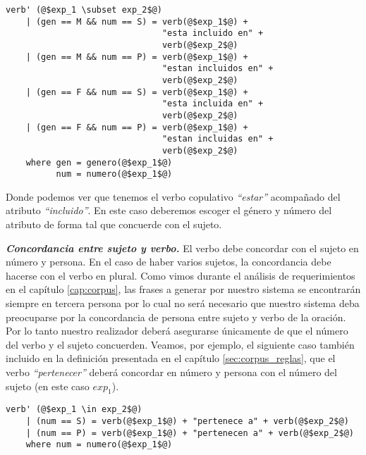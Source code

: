 \begin{mdframed}[style=codebox]
\begin{verbatim}
verb' (@$exp_1 \subset exp_2$@)
    | (gen == M && num == S) = verb(@$exp_1$@) + 
                               "esta incluido en" + 
                               verb(@$exp_2$@) 
    | (gen == M && num == P) = verb(@$exp_1$@) + 
                               "estan incluidos en" + 
                               verb(@$exp_2$@) 
    | (gen == F && num == S) = verb(@$exp_1$@) + 
                               "esta incluida en" + 
                               verb(@$exp_2$@) 
    | (gen == F && num == P) = verb(@$exp_1$@) + 
                               "estan incluidas en" + 
                               verb(@$exp_2$@) 
    where gen = genero(@$exp_1$@)
          num = numero(@$exp_1$@)
\end{verbatim}
\end{mdframed}

\noindent
Donde podemos ver que tenemos el verbo copulativo \emph{``estar''} acompañado del atributo \emph{``incluido''}. En este caso deberemos escoger el género y número del atributo de forma tal que concuerde con el sujeto.

\medskip
\noindent
\textbf{\emph{Concordancia entre sujeto y verbo.}} El verbo debe concordar con el sujeto en número y persona. En el caso de haber varios sujetos, la concordancia debe hacerse con el verbo en plural. Como vimos durante el análisis de requerimientos en el capítulo \ref{cap:corpus}, las frases a generar por nuestro sistema se encontrarán siempre en tercera persona por lo cual no será necesario que nuestro sistema deba preocuparse por la concordancia de persona entre sujeto y verbo de la oración. Por lo tanto nuestro realizador deberá asegurarse únicamente de que el número del verbo y el sujeto concuerden.
\noindent
Veamos, por ejemplo, el siguiente caso también incluido en la definición presentada en el capítulo \ref{sec:corpus_reglas}, que el verbo \emph{``pertenecer''} deberá concordar en número y persona con el número del sujeto (en este caso $exp_1$). 

\begin{mdframed}[style=codebox]
\begin{verbatim}
verb' (@$exp_1 \in exp_2$@)
    | (num == S) = verb(@$exp_1$@) + "pertenece a" + verb(@$exp_2$@) 
    | (num == P) = verb(@$exp_1$@) + "pertenecen a" + verb(@$exp_2$@) 
    where num = numero(@$exp_1$@)
\end{verbatim}
\end{mdframed}

